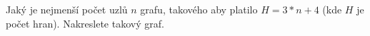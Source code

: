 \subsubsection{}
Jaký je nejmenší počet uzlů $n$ grafu, takového aby platilo $H=3*n + 4$ (kde $H$
je počet hran). Nakreslete takový graf.
